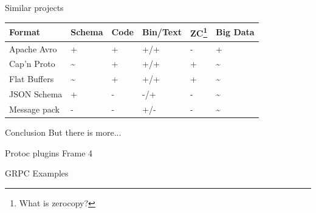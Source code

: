 \documentclass{beamer}
\begin{document}
\begin{frame}{Similar projects}
  \begin{center}
    \begin{tabular}{ l l l l l l }
      Format & Schema & Code & Bin/Text & ZC\footnote[1]{ What is zerocopy? }  & Big Data \\
      \hline
      Apache Avro & + & + & +/+ & - & + \\
      Cap'n Proto & \textasciitilde & + & +/+ & + & \textasciitilde \\
      Flat Buffers & \textasciitilde & + & +/+ & + & \textasciitilde \\
      JSON Schema & + & - & -/+ & - & \textasciitilde \\
      Message pack & - & - & +/- & - & \textasciitilde
    \end{tabular}
  \end{center}
\end{frame}

\begin{frame}{Conclusion}
But there is more...
\end{frame}

\begin{frame}{Protoc plugins}
Frame 4
\end{frame}

\begin{frame}{GRPC}
Examples
\end{frame}
\end{document}
